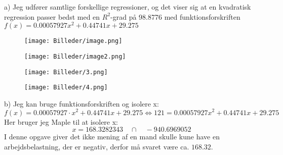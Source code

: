 a)
Jeg udfører samtlige forskellige regressioner, og det viser sig at en kvadratisk regression passer bedst med en $R^2$-grad på 98.8776 med funktionsforskriften $f(x)=0.00057927x^2+0.44741x+29.275$
\begin{figure}[H]
    \centering
    \texttt{[image: Billeder/image.png]}
\end{figure}

\begin{figure}[H]
    \centering
    \texttt{[image: Billeder/image2.png]}
\end{figure}

\begin{figure}[H]
    \centering
    \texttt{[image: Billeder/3.png]}
\end{figure}

\begin{figure}[H]
    \centering
    \texttt{[image: Billeder/4.png]}
\end{figure}

b)
Jeg kan bruge funktionsforskriften og isolere x:
$$f(x)=0.00057927\cdot x^2 + 0.44741x + 29.275\Longleftrightarrow 121 = 0.00057927x^2 + 0.44741x + 29.275$$
Her bruger jeg Maple til at isolere x:
$$x = 168.3282343 \quad \cap \quad -940.6969052$$
I denne opgave giver det ikke mening af en mand skulle kune have en arbejdsbelastning, der er negativ, derfor må svaret være ca. $168.32$.\newpage